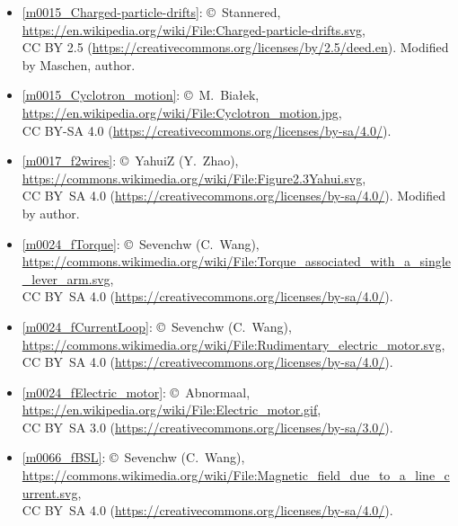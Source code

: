 \begin{itemize}

\item[Fig.] \label{m0015_Charged-particle-drifts_Credit}
  \ref{m0015_Charged-particle-drifts}:
  \copyright~Stannered, 
  \url{https://en.wikipedia.org/wiki/File:Charged-particle-drifts.svg},\\ 
  CC BY 2.5 (\url{https://creativecommons.org/licenses/by/2.5/deed.en}).
  Modified by Maschen, author.

\item[Fig.] \label{m0015_Cyclotron_motion_Credit}
  \ref{m0015_Cyclotron_motion}:
  \copyright~M.~Białek, 
  \url{https://en.wikipedia.org/wiki/File:Cyclotron_motion.jpg},\\ 
  CC BY-SA 4.0 (\url{https://creativecommons.org/licenses/by-sa/4.0/}).

\item[Fig.] \label{m0017_f2wires_Credit}
  \ref{m0017_f2wires}:
  \copyright~YahuiZ (Y.\ Zhao), 
  \url{https://commons.wikimedia.org/wiki/File:Figure2.3Yahui.svg},\\ 
  CC BY~SA 4.0 (\url{https://creativecommons.org/licenses/by-sa/4.0/}).
  Modified by author.

\item[Fig.] \label{m0024_fTorque_Credit}
  \ref{m0024_fTorque}:
  \copyright~Sevenchw (C.\ Wang), 
  \url{https://commons.wikimedia.org/wiki/File:Torque_associated_with_a_single_lever_arm.svg},\\ 
  CC BY~SA 4.0 (\url{https://creativecommons.org/licenses/by-sa/4.0/}).

\item[Fig.] \label{m0024_fCurrentLoop_Credit}
  \ref{m0024_fCurrentLoop}:
  \copyright~Sevenchw (C.\ Wang), 
  \url{https://commons.wikimedia.org/wiki/File:Rudimentary_electric_motor.svg},\\ 
  CC BY~SA 4.0 (\url{https://creativecommons.org/licenses/by-sa/4.0/}).

\item[Fig.] \label{m0024_fElectric_motor_Credit}
  \ref{m0024_fElectric_motor}:
  \copyright~Abnormaal, 
  \url{https://en.wikipedia.org/wiki/File:Electric_motor.gif},\\ 
  CC BY~SA 3.0 (\url{https://creativecommons.org/licenses/by-sa/3.0/}).

\item[Fig.] \label{m0066_fBSL_Credit}
  \ref{m0066_fBSL}:
  \copyright~Sevenchw (C.\ Wang), 
  \url{https://commons.wikimedia.org/wiki/File:Magnetic_field_due_to_a_line_current.svg},\\ 
  CC BY~SA 4.0 (\url{https://creativecommons.org/licenses/by-sa/4.0/}).


\end{itemize}
